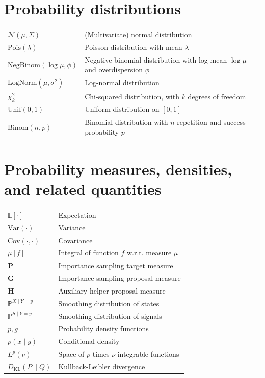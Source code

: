 \section*{Probability distributions}
\noindent
\begin{tabular}{@{} p{\symcolwidth} p{\dimexpr\linewidth-\symcolwidth-2\tabcolsep\relax} @{}}
$\mathcal{N}(\mu, \Sigma)$         & (Multivariate) normal distribution \\
$\mathrm{Pois}(\lambda)$           & Poisson distribution with mean $\lambda$\\
$\mathrm{NegBinom}(\log \mu, \phi)$     & Negative binomial distribution with log mean $\log \mu$ and overdispersion $\phi$ \\
$\mathrm{LogNorm}(\mu, \sigma^2)$  & Log-normal distribution \\
$\chi^2_k$                         & Chi-squared distribution, with $k$ degrees of freedom \\
$\mathrm{Unif}(0,1)$               & Uniform distribution on $[0,1]$ \\
$\mathrm{Binom}(n,p)$              & Binomial distribution with $n$ repetition and success probability $p$ \\
\end{tabular}

\section*{Probability measures, densities, and related quantities}
\noindent
\begin{tabular}{@{} p{\symcolwidth} p{\dimexpr\linewidth-\symcolwidth-2\tabcolsep\relax} @{}}
$\mathbb{E}[\cdot]$              & Expectation \\
$\mathrm{Var}(\cdot)$            & Variance \\
$\mathrm{Cov}(\cdot,\cdot)$      & Covariance \\
$\mu[f]$                         & Integral of function $f$ w.r.t. measure $\mu$ \\
$\mathbf{P}$                     & Importance sampling target measure \\
$\mathbf{G}$                     & Importance sampling proposal measure \\
$\mathbf{H}$                     & Auxiliary helper proposal measure \\
$\mathbb{P}^{X \mid Y = y}$      & Smoothing distribution of states \\
$\mathbb{P}^{S \mid Y = y}$      & Smoothing distribution of signals \\
$p, g$                           & Probability density functions \\
$p(x \mid y)$                    & Conditional density \\
$L^p(\nu)$                       & Space of $p$-times $\nu$-integrable functions \\
$D_\mathrm{KL}(P \| Q)$          & Kullback-Leibler divergence 
\end{tabular}

